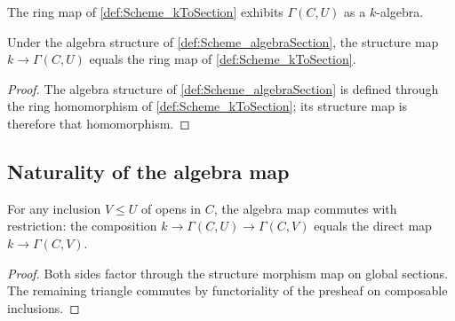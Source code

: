 \begin{definition}\leanok
  \label{def:Scheme_algebraSection}

  The ring map of \cref{def:Scheme_kToSection} exhibits \(\Gamma(C, U)\) as a \(k\)-algebra.
\end{definition}

\begin{lemma}\leanok
  \label{lem:Scheme_algebraMap_eq_kToSection}

  Under the algebra structure of \cref{def:Scheme_algebraSection}, the structure map \(k \to \Gamma(C, U)\) equals the ring map of \cref{def:Scheme_kToSection}.
\end{lemma}

\begin{proof}
  
  \leanok
  The algebra structure of \cref{def:Scheme_algebraSection} is defined through the ring homomorphism of \cref{def:Scheme_kToSection}; its structure map is therefore that homomorphism.
\end{proof}

\subsection{Naturality of the algebra map}

\begin{lemma}\leanok
  \label{lem:Scheme_kToSection_naturality}

  For any inclusion \(V \le U\) of opens in \(C\), the algebra map commutes with restriction: the composition \(k \to \Gamma(C, U) \to \Gamma(C, V)\) equals the direct map \(k \to \Gamma(C, V)\).
\end{lemma}

\begin{proof}
  
  \leanok
  Both sides factor through the structure morphism map on global sections. The remaining triangle commutes by functoriality of the presheaf on composable inclusions.
\end{proof}

